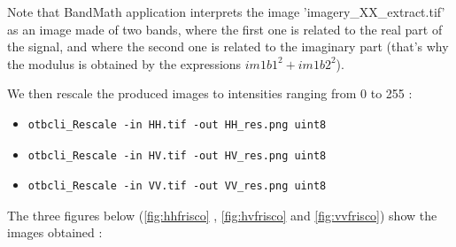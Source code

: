 Note that BandMath application interprets the image 'imagery\_XX\_extract.tif' as an image made of two bands, where the first one is related to the real part of the signal,
and where the second one is related to the imaginary part (that's why the modulus is obtained by the expressions $im1b1^2+im1b2^2$).


We then rescale the produced images to intensities ranging from 0 to 255 :

\begin{itemize}
\item 
\begin{verbatim} 
otbcli_Rescale -in HH.tif -out HH_res.png uint8 
\end{verbatim}
									  
\item 
\begin{verbatim} 
otbcli_Rescale -in HV.tif -out HV_res.png uint8 
\end{verbatim}
									  
\item 
\begin{verbatim} 
otbcli_Rescale -in VV.tif -out VV_res.png uint8 
\end{verbatim}
\end{itemize}

The three figures below (\ref{fig:hhfrisco} , \ref{fig:hvfrisco} and \ref{fig:vvfrisco}) show the images obtained :

